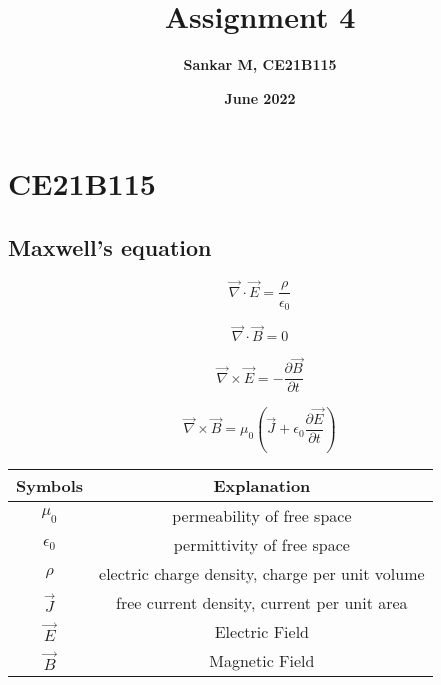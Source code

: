 
\section{CE21B115}


\title{\textbf{Assignment 4}}
\author{\textbf{Sankar M, CE21B115 }}
\date{\textbf{June 2022}}

\maketitle
\subsection{Maxwell's equation}

\begin{equation}
   \Vec{\nabla}\cdot\Vec{E} = \frac{\rho}{\epsilon_{0}} 
\end{equation}

\begin{equation}
   \Vec{\nabla}\cdot\Vec{B} = 0 
\end{equation} 

\begin{equation}
    \Vec{\nabla}\times\Vec{E} = -\frac{\partial\Vec{B}}{\partial t} 
\end{equation}

\begin{equation}
    \Vec{\nabla}\times\Vec{B}=\mu_{0} (\Vec{J} + \epsilon_{0} \frac{\partial\Vec{E}}{\partial t} )
\end{equation}

\begin{center}
\begin{tabular}{|c|c|}
    \hline
    \textbf{Symbols} & \textbf{Explanation} \\
    \hline
    $\mu_{0}$ & permeability of free space \\
    \hline
    $\epsilon_{0}$ & permittivity of free space \\
    \hline
    $\rho$ & electric charge density, charge per unit volume \\
    \hline
    $\Vec{J}$ & free current density, current per unit area  \\
    \hline
    $\Vec{E}$ & Electric Field \\
    \hline
    $\Vec{B}$ & Magnetic Field \\
    \hline
\end{tabular}
\end{center}

